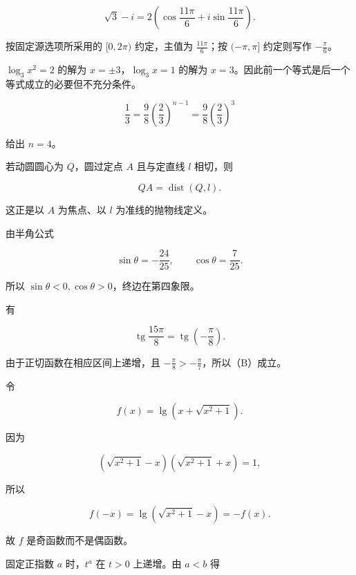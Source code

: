 \begin{answer}
\nopagebreak[4]
\[
\sqrt3-i
=2\left(\cos\frac{11\pi}{6}+i\sin\frac{11\pi}{6}\right).
\]

按固定源选项所采用的 $[0,2\pi)$ 约定，主值为 $\frac{11\pi}{6}$；按 $(-\pi,\pi]$ 约定则写作 $-\frac\pi6$。


$\log_3x^2=2$ 的解为 $x=\pm3$，$\log_3x=1$ 的解为 $x=3$。因此前一个等式是后一个等式成立的必要但不充分条件。


\nopagebreak[4]
\[
\frac13=\frac98\left(\frac23\right)^{n-1}
=\frac98\left(\frac23\right)^3
\]

给出 $n=4$。


若动圆圆心为 $Q$，圆过定点 $A$ 且与定直线 $l$ 相切，则

\nopagebreak[4]
\[
QA=\operatorname{dist}(Q,l).
\]

这正是以 $A$ 为焦点、以 $l$ 为准线的抛物线定义。


由半角公式

\nopagebreak[4]
\[
\sin\theta=-\frac{24}{25},\qquad
\cos\theta=\frac7{25}.
\]

所以 $\sin\theta<0,\cos\theta>0$，终边在第四象限。


有

\nopagebreak[4]
\[
\operatorname{tg}\frac{15\pi}{8}
=\operatorname{tg}\left(-\frac\pi8\right).
\]

由于正切函数在相应区间上递增，且 $-\frac\pi8>-\frac\pi7$，所以（B）成立。


令

\nopagebreak[4]
\[
f(x)=\lg\left(x+\sqrt{x^2+1}\right).
\]

因为

\nopagebreak[4]
\[
\left(\sqrt{x^2+1}-x\right)
\left(\sqrt{x^2+1}+x\right)=1,
\]

所以

\nopagebreak[4]
\[
f(-x)
=\lg\left(\sqrt{x^2+1}-x\right)
=-f(x).
\]

故 $f$ 是奇函数而不是偶函数。


固定正指数 $a$ 时，$t^a$ 在 $t>0$ 上递增。由 $a<b$ 得


\end{answer}
